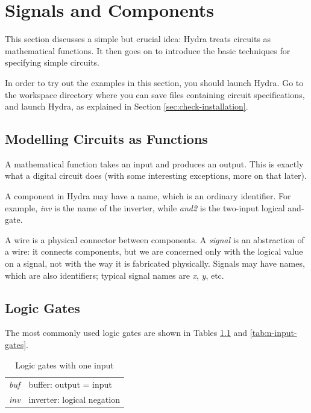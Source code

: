 \documentclass[a4paper,openany,fleqn]{book}
\begin{document}
\chapter{Signals and Components}
\label{sec:signals-components}

This section discusses a simple but crucial idea: Hydra treats
circuits as mathematical functions.  It then goes on to introduce the
basic techniques for specifying simple circuits.

In order to try out the examples in this section, you should launch
Hydra.  Go to the workspace directory where you can save files
containing circuit specifications, and launch Hydra, as explained in
Section \ref{sec:check-installation}.

\section{Modelling Circuits as Functions}
\label{sec:circuits-as-functions}

A mathematical function takes an input and produces an output.  This
is exactly what a digital circuit does (with some interesting
exceptions, more on that later).  

A component in Hydra may have a name, which is an ordinary identifier.
For example, \textit{inv} is the name of the inverter, while
\textit{and2} is the two-input logical and-gate.

A wire is a physical connector between components.  A \emph{signal} is
an abstraction of a wire: it connects components, but we are concerned
only with the logical value on a signal, not with the way it is
fabricated physically.  Signals may have names, which are also
identifiers; typical signal names are \textit{x}, \textit{y}, etc.

\section{Logic Gates}
\label{sec:logic-gates}

The most commonly used logic gates are shown in Tables
\ref{tab:1-input-gates} and \ref{tab:n-input-gates}.

\begin{table}[htbp]
  \begin{center}
    \caption{Logic gates with one input}
    \label{tab:1-input-gates}
\begin{tabular}[c]{ll}
\textit{buf}   & buffer: output = input \\
\textit{inv}   & inverter: logical negation \\
\end{tabular}
  \end{center}
\end{table}
\end{document}

